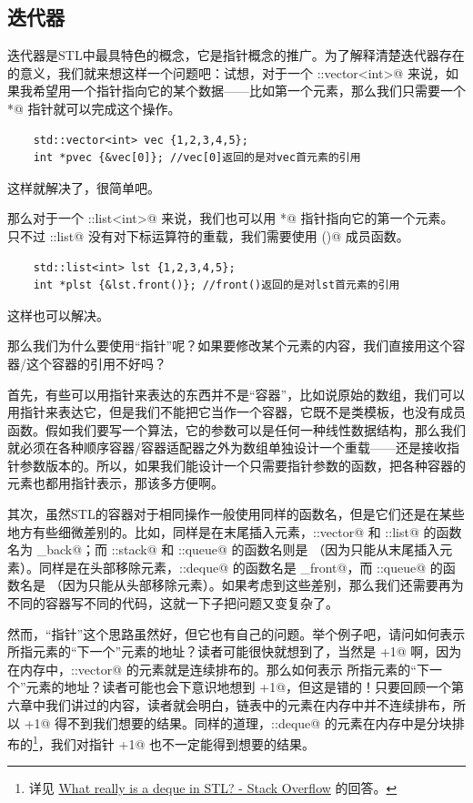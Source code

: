 \subsection*{迭代器}
迭代器是STL中最具特色的概念，它是指针概念的推广。为了解释清楚迭代器存在的意义，我们就来想这样一个问题吧：试想，对于一个 \lstinline@std::vector<int>@ 来说，如果我希望用一个指针指向它的某个数据——比如第一个元素，那么我们只需要一个 \lstinline@int*@ 指针就可以完成这个操作。
\begin{lstlisting}
    std::vector<int> vec {1,2,3,4,5};
    int *pvec {&vec[0]}; //vec[0]返回的是对vec首元素的引用
\end{lstlisting}
这样就解决了，很简单吧。\par
那么对于一个 \lstinline@std::list<int>@ 来说，我们也可以用 \lstinline@int*@ 指针指向它的第一个元素。只不过 \lstinline@std::list@ 没有对下标运算符的重载，我们需要使用 \lstinline@front()@ 成员函数。
\begin{lstlisting}
    std::list<int> lst {1,2,3,4,5};
    int *plst {&lst.front()}; //front()返回的是对lst首元素的引用
\end{lstlisting}
这样也可以解决。\par
那么我们为什么要使用``指针''呢？如果要修改某个元素的内容，我们直接用这个容器/这个容器的引用不好吗？\par
首先，有些可以用指针来表达的东西并不是``容器''，比如说原始的数组，我们可以用指针来表达它，但是我们不能把它当作一个容器，它既不是类模板，也没有成员函数。假如我们要写一个算法，它的参数可以是任何一种线性数据结构，那么我们就必须在各种顺序容器/容器适配器之外为数组单独设计一个重载——还是接收指针参数版本的。所以，如果我们能设计一个只需要指针参数的函数，把各种容器的元素也都用指针表示，那该多方便啊。\par
其次，虽然STL的容器对于相同操作一般使用同样的函数名，但是它们还是在某些地方有些细微差别的。比如，同样是在末尾插入元素，\lstinline@std::vector@ 和 \lstinline@std::list@ 的函数名为 \lstinline@push_back@；而 \lstinline@std::stack@ 和 \lstinline@std::queue@ 的函数名则是 \lstinline@pop@（因为只能从末尾插入元素）。同样是在头部移除元素，\lstinline@std::deque@ 的函数名是 \lstinline@pop_front@，而 \lstinline@std::queue@ 的函数名是 \lstinline@pop@（因为只能从头部移除元素）。如果考虑到这些差别，那么我们还需要再为不同的容器写不同的代码，这就一下子把问题又变复杂了。\par
然而，``指针''这个思路虽然好，但它也有自己的问题。举个例子吧，请问如何表示 \lstinline@pvec@ 所指元素的``下一个''元素的地址？读者可能很快就想到了，当然是 \lstinline@pvec+1@ 啊，因为在内存中，\lstinline@std::vector@ 的元素就是连续排布的。那么如何表示 \lstinline@plst@ 所指元素的``下一个''元素的地址？读者可能也会下意识地想到 \lstinline@plst+1@，但这是错的！只要回顾一个第六章中我们讲过的内容，读者就会明白，链表中的元素在内存中并不连续排布，所以 \lstinline@plst+1@ 得不到我们想要的结果。同样的道理，\lstinline@std::deque@ 的元素在内存中是分块排布的\footnote{详见 \href{https://stackoverflow.com/a/6292437/22112284}{What really is a deque in STL? - Stack Overflow} 的回答。}，我们对指针 \lstinline@+1@ 也不一定能得到想要的结果。\par
